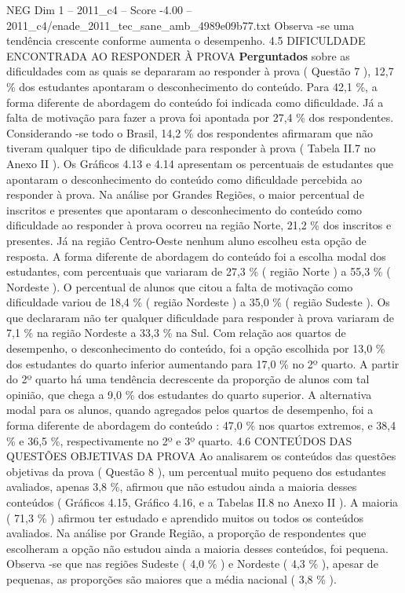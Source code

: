 \begin{textsample}{NEG Dim 1 – 2011\_c4 – Score -4.00 – 2011\_c4/enade\_2011\_tec\_sane\_amb\_4989e09b77.txt}
Observa -se uma tendência crescente conforme aumenta o desempenho. 4.5 DIFICULDADE ENCONTRADA AO RESPONDER À PROVA \textbf{Perguntados} sobre as dificuldades com as quais se depararam ao responder à prova ( Questão 7 ), 12,7 \% dos estudantes apontaram o desconhecimento do conteúdo.
Para 42,1 \%, a forma diferente de abordagem do conteúdo foi indicada como dificuldade.
Já a falta de motivação para fazer a prova foi apontada por 27,4 \% dos respondentes.
Considerando -se todo o Brasil, 14,2 \% dos respondentes afirmaram que não tiveram qualquer tipo de dificuldade para responder à prova ( Tabela II.7 no Anexo II ).
Os Gráficos 4.13 e 4.14 apresentam os percentuais de estudantes que apontaram o desconhecimento do conteúdo como dificuldade percebida ao responder à prova.
Na análise por Grandes Regiões, o maior percentual de inscritos e presentes que apontaram o desconhecimento do conteúdo como dificuldade ao responder à prova ocorreu na região Norte, 21,2 \% dos inscritos e presentes.
Já na região Centro-Oeste nenhum aluno escolheu esta opção de resposta.
A forma diferente de abordagem do conteúdo foi a escolha modal dos estudantes, com percentuais que variaram de 27,3 \% ( região Norte ) a 55,3 \% ( Nordeste ).
O percentual de alunos que citou a falta de motivação como dificuldade variou de 18,4 \% ( região Nordeste ) a 35,0 \% ( região Sudeste ).
Os que declararam não ter qualquer dificuldade para responder à prova variaram de 7,1 \% na região Nordeste a 33,3 \% na Sul.
Com relação aos quartos de desempenho, o desconhecimento do conteúdo, foi a opção escolhida por 13,0 \% dos estudantes do quarto inferior aumentando para 17,0 \% no 2º quarto.
A partir do 2º quarto há uma tendência decrescente da proporção de alunos com tal opinião, que chega a 9,0 \% dos estudantes do quarto superior.
A alternativa modal para os alunos, quando agregados pelos quartos de desempenho, foi a forma diferente de abordagem do conteúdo : 47,0 \% nos quartos extremos, e 38,4 \% e 36,5 \%, respectivamente no 2º e 3º quarto. 4.6 CONTEÚDOS DAS QUESTÕES OBJETIVAS DA PROVA Ao analisarem os conteúdos das questões objetivas da prova ( Questão 8 ), um percentual muito pequeno dos estudantes avaliados, apenas 3,8 \%, afirmou que não estudou ainda a maioria desses conteúdos ( Gráficos 4.15, Gráfico 4.16, e a Tabelas II.8 no Anexo II ).
A maioria ( 71,3 \% ) afirmou ter estudado e aprendido muitos ou todos os conteúdos avaliados.
Na análise por Grande Região, a proporção de respondentes que escolheram a opção não estudou ainda a maioria desses conteúdos, foi pequena.
Observa -se que nas regiões Sudeste ( 4,0 \% ) e Nordeste ( 4,3 \% ), apesar de pequenas, as proporções são maiores que a média nacional ( 3,8 \% ).

\end{textsample}
